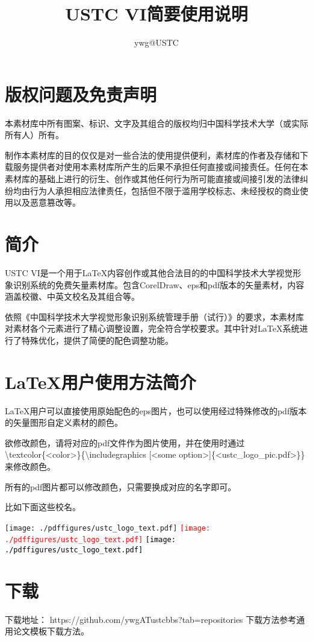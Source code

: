 \documentclass{article}
\title{USTC VI简要使用说明}
\author{ywg@USTC}
\date{}
\begin{document}
\maketitle
\section{版权问题及免责声明}
本素材库中所有图案、标识、文字及其组合的版权均归中国科学技术大学（或实际所有人）所有。

制作本素材库的目的仅仅是对一些合法的使用提供便利，素材库的作者及存储和下载服务提供者对使用本素材库所产生的后果不承担任何直接或间接责任。任何在本素材库的基础上进行的衍生、创作或其他任何行为所可能直接或间接引发的法律纠纷均由行为人承担相应法律责任，包括但不限于滥用学校标志、未经授权的商业使用以及恶意篡改等。

\section{简介}
USTC VI是一个用于\LaTeX{}内容创作或其他合法目的的中国科学技术大学视觉形象识别系统的免费矢量素材库。包含CorelDraw、eps和pdf版本的矢量素材，内容涵盖校徽、中英文校名及其组合等。

依照《中国科学技术大学视觉形象识别系统管理手册（试行）》的要求，本素材库对素材各个元素进行了精心调整设置，完全符合学校要求。其中针对\LaTeX{}系统进行了特殊优化，提供了简便的配色调整功能。

\section{\LaTeX{}用户使用方法简介}
\LaTeX{}用户可以直接使用原始配色的eps图片，也可以使用经过特殊修改的pdf版本的矢量图形自定义素材的颜色。

欲修改颜色，请将对应的pdf文件作为图片使用，并在使用时通过\textbackslash{}textcolor\{<color>\}\{\textbackslash{}includegraphics [<some option>]\{<ustc\_logo\_pic.pdf>\}\}来修改颜色。

所有的pdf图片都可以修改颜色，只需要换成对应的名字即可。

比如下面这些校名。

\noindent
\textcolor{ustcblue}{\texttt{[image: ./pdffigures/ustc\_logo\_text.pdf]}}
\textcolor{red}{\texttt{[image: ./pdffigures/ustc\_logo\_text.pdf]}}
\textcolor{black}{\texttt{[image: ./pdffigures/ustc\_logo\_text.pdf]}}

\section{下载}
下载地址： https://github.com/ywgATustcbbs?tab=repositories
下载方法参考通用论文模板下载方法。
\end{document}
